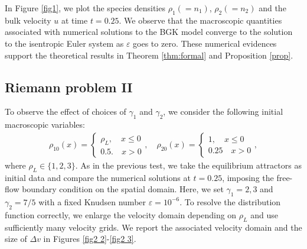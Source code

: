 \documentclass[10pt,reqno]{amsart}
\numberwithin{equation}{section}
\begin{document}
In Figure \ref{fig1}, we plot the species densities $\rho_1(=n_1)$, $\rho_2(=n_2)$ and the bulk velocity $u$ at time $t=0.25$. We observe that the macroscopic quantities associated with numerical solutions to the BGK model converge to the solution to the isentropic Euler system as $\varepsilon$ goes to zero. These numerical evidences support the theoretical results in Theorem \ref{thm:formal} and Proposition \ref{prop}.


 
%
%
%
%
%
%
%
%
%
%
%
%
\subsection{Riemann problem II}
To observe the effect of choices of $\gamma_1$ and $\gamma_2$, we consider the following initial macroscopic variables:
\begin{align*}
	\rho_{10}(x)=\begin{cases}
		\rho_L,\quad x\leq 0\\
		0.5.\quad x>0
	\end{cases},\quad 	\rho_{20}(x)=\begin{cases}
		1,\quad x\leq 0\\
		0.25\quad x>0
	\end{cases},
\end{align*}
where $\rho_L \in \{1,2,3\}$. As in the previous test, we take the equilibrium attractors as initial data and compare the numerical solutions at $t=0.25$, imposing the free-flow boundary condition on the spatial domain. Here, we set $\gamma_1=2,3$ and $\gamma_2=7/5$ with a fixed Knudsen number $\varepsilon=10^{-6}$. To resolve the distribution function correctly, we enlarge the velocity domain depending on $\rho_L$ and use sufficiently many velocity grids. We report the associated velocity domain and the size of $\Delta v$ in Figures \ref{fig2 2}-\ref{fig2 3}. 
\end{document}
